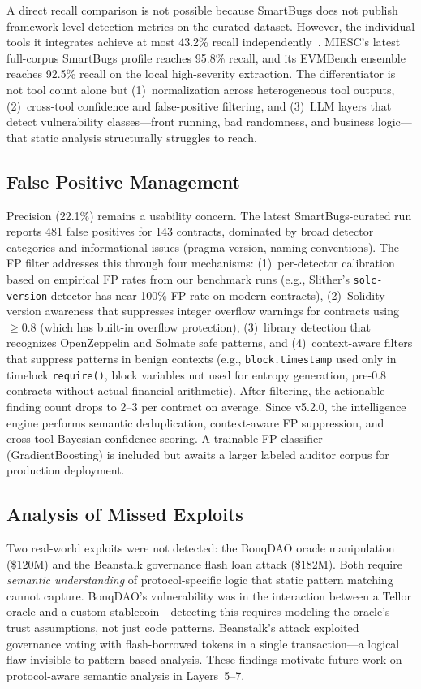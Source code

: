 \documentclass[conference]{IEEEtran}
\begin{document}
A direct recall comparison is not possible because SmartBugs does not publish framework-level detection metrics on the curated dataset. However, the individual tools it integrates achieve at most 43.2\% recall independently~\cite{durieux2020empirical}. MIESC's latest full-corpus SmartBugs profile reaches 95.8\% recall, and its EVMBench ensemble reaches 92.5\% recall on the local high-severity extraction. The differentiator is not tool count alone but (1)~normalization across heterogeneous tool outputs, (2)~cross-tool confidence and false-positive filtering, and (3)~LLM layers that detect vulnerability classes---front running, bad randomness, and business logic---that static analysis structurally struggles to reach.

\subsection{False Positive Management}

Precision (22.1\%) remains a usability concern. The latest SmartBugs-curated run reports 481 false positives for 143 contracts, dominated by broad detector categories and informational issues (pragma version, naming conventions). The FP filter addresses this through four mechanisms: (1)~per-detector calibration based on empirical FP rates from our benchmark runs (e.g., Slither's \texttt{solc-version} detector has near-100\% FP rate on modern contracts), (2)~Solidity version awareness that suppresses integer overflow warnings for contracts using $\geq$0.8 (which has built-in overflow protection), (3)~library detection that recognizes OpenZeppelin and Solmate safe patterns, and (4)~context-aware filters that suppress patterns in benign contexts (e.g., \texttt{block.timestamp} used only in timelock \texttt{require()}, block variables not used for entropy generation, pre-0.8 contracts without actual financial arithmetic). After filtering, the actionable finding count drops to 2--3 per contract on average. Since v5.2.0, the intelligence engine performs semantic deduplication, context-aware FP suppression, and cross-tool Bayesian confidence scoring. A trainable FP classifier (GradientBoosting) is included but awaits a larger labeled auditor corpus for production deployment.

\subsection{Analysis of Missed Exploits}

Two real-world exploits were not detected: the BonqDAO oracle manipulation (\$120M) and the Beanstalk governance flash loan attack (\$182M). Both require \emph{semantic understanding} of protocol-specific logic that static pattern matching cannot capture. BonqDAO's vulnerability was in the interaction between a Tellor oracle and a custom stablecoin---detecting this requires modeling the oracle's trust assumptions, not just code patterns. Beanstalk's attack exploited governance voting with flash-borrowed tokens in a single transaction---a logical flaw invisible to pattern-based analysis. These findings motivate future work on protocol-aware semantic analysis in Layers~5--7.
\end{document}
